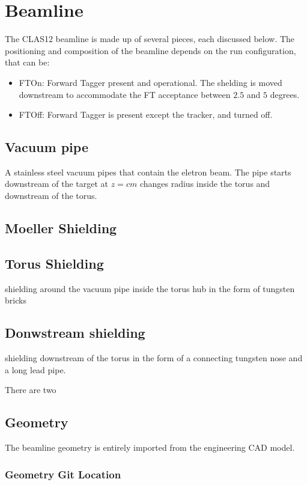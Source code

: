 \section{Beamline}

The CLAS12 beamline is made up of several pieces, each discussed below. The positioning and composition of the beamline
depends on the run configuration, that can be:

\begin{itemize}
	\item FTOn: Forward Tagger present and operational. The shelding is moved downstream to accommodate the FT acceptance between
          $2.5$ and $5$ degrees.
	\item FTOff: Forward Tagger is present except the tracker, and turned off.
\end{itemize}


\subsection{Vacuum pipe}

A stainless steel vacuum pipes that contain the eletron beam. The pipe starts downstream of the target at $z=cm$
changes radius inside the torus and downstream of the torus.

\subsection{Moeller Shielding}


\subsection{Torus Shielding}
shielding around the vacuum pipe inside the torus hub in the form of tungsten bricks

\subsection{Donwstream shielding}
shielding downstream of the torus in the form of a connecting tungsten nose and a long lead pipe.


There are two

\subsection{Geometry}

The beamline geometry is entirely imported from the engineering CAD model.


\subsubsection{Geometry Git Location}

